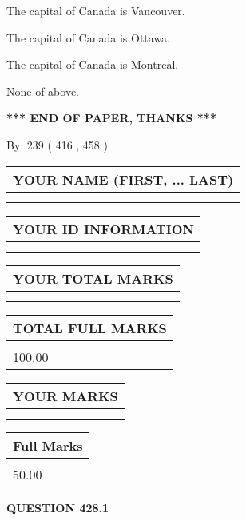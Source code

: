 \documentclass[12pt]{article}
\begin{document}
  
 
 
The capital of Canada is Vancouver.
 
 
The capital of Canada is Ottawa.
 
 
The capital of Canada is Montreal.
 
 
 None of above.
 
 
   
   
\vspace{1.0in} 
{\textbf{\large{ *** END OF PAPER, THANKS *** }}} 
   
   
\hspace{1.0in} By: 
 239 ( 416 ,  458 )
   
   
   
   
\newpage 
\setcounter{page}{ 
   428001 } 
   
   
   
   
\noindent\begin{tabular}{|l|}
\hline
YOUR NAME (FIRST, ... LAST)  \\
\hline
 \\ 
 \\ 
\hline
\end{tabular}
\hspace{0.05in} \begin{tabular}{|l|}
\hline
 YOUR   ID   INFORMATION  \\
\hline
 \\ 
 \\ 
\hline
\end{tabular}
   
   
\vspace{0.2in}\noindent\begin{tabular}{|l|}
\hline
YOUR TOTAL MARKS  \\
\hline
 \\ 
 \\ 
\hline
\end{tabular}
\hspace{0.05in} \begin{tabular}{|l|}
\hline
TOTAL FULL MARKS  \\
\hline
 \\ 
100.00 \\
\hline
\end{tabular}
  
\vspace{0.2in}
  
\noindent\begin{tabular}{|l|}
\hline
 YOUR MARKS  \\
\hline
 \\ 
 \\ 
\hline
\end{tabular}
\hspace{0.05in} \begin{tabular}{|l|}
\hline
 Full Marks  \\
\hline
 \\ 
50.00 \\
\hline
\end{tabular}
{\textbf{\Large{QUESTION
428.1 
}}}
  
\end{document}
